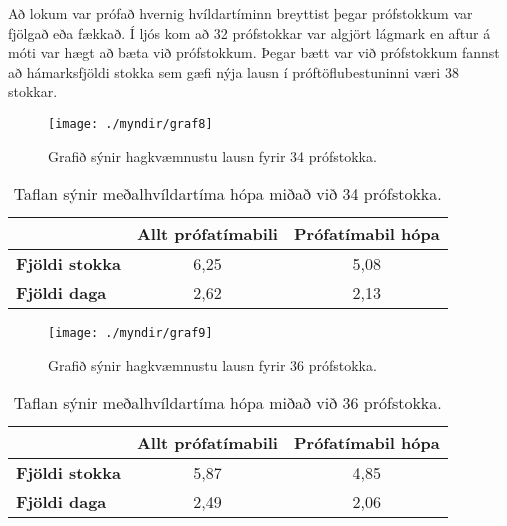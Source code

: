 \documentclass[12pt]{article}
\begin{document}
\newpage

Að lokum var prófað hvernig hvíldartíminn breyttist þegar prófstokkum var fjölgað eða fækkað. Í ljós kom að 32 prófstokkar var algjört lágmark en aftur á móti var hægt að bæta við prófstokkum. Þegar bætt var við prófstokkum fannst að hámarksfjöldi stokka sem gæfi nýja lausn í próftöflubestuninni væri 38 stokkar. 

\begin{figure}[h]
    \centering
    \texttt{[image: ./myndir/graf8]}
    \caption{Grafið sýnir hagkvæmnustu lausn fyrir 34 prófstokka.}
\end{figure}

\begin{table}[h]
    \centering
    \begin{tabular}{l|c|c|}
        \cline{2-3}
        & \multicolumn{1}{l|}{\textbf{Allt prófatímabili}} & \multicolumn{1}{l|}{\textbf{Prófatímabil hópa}} \\ \hline
        \multicolumn{1}{|l|}{\textbf{Fjöldi stokka}} & 6,25                                             & 5,08                                            \\ \hline
        \multicolumn{1}{|l|}{\textbf{Fjöldi daga}}   & 2,62                                             & 2,13                                            \\ \hline
    \end{tabular}
    \caption{Taflan sýnir meðalhvíldartíma hópa miðað við 34 prófstokka.}
\end{table}



\newpage
\begin{figure}[h]
    \centering
    \texttt{[image: ./myndir/graf9]}
    \caption{Grafið sýnir hagkvæmnustu lausn fyrir 36 prófstokka.}
\end{figure}

\begin{table}[h]
    \centering
    \begin{tabular}{l|c|c|}
        \cline{2-3}
        & \multicolumn{1}{l|}{\textbf{Allt prófatímabili}} & \multicolumn{1}{l|}{\textbf{Prófatímabil hópa}} \\ \hline
        \multicolumn{1}{|l|}{\textbf{Fjöldi stokka}} & 5,87                                             & 4,85                                            \\ \hline
        \multicolumn{1}{|l|}{\textbf{Fjöldi daga}}   & 2,49                                             & 2,06                                            \\ \hline
    \end{tabular}
    \caption{Taflan sýnir meðalhvíldartíma hópa miðað við 36 prófstokka.}
\end{table}
\end{document}
